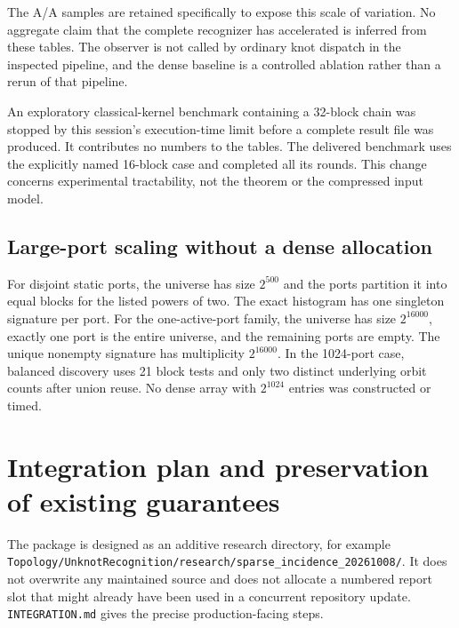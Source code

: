 \documentclass[11pt,letterpaper]{article}
\newcommand{\code}[1]{\nolinkurl{#1}}
\begin{document}
The A/A samples are retained specifically to expose this scale of variation.
No aggregate claim that the complete recognizer has accelerated is inferred
from these tables. The observer is not called by ordinary knot dispatch in the
inspected pipeline, and the dense baseline is a controlled ablation rather than
a rerun of that pipeline.

An exploratory classical-kernel benchmark containing a 32-block chain was
stopped by this session's execution-time limit before a complete result file
was produced. It contributes no numbers to the tables. The delivered benchmark
uses the explicitly named 16-block case and completed all its rounds. This
change concerns experimental tractability, not the theorem or the compressed
input model.

\subsection{Large-port scaling without a dense allocation}
\begin{table}[htbp]
\centering\small

\caption{Completed balanced-only scaling runs, seven repetitions each. The
``dense slots'' column is the output-format requirement, not a measured dense
run or an extrapolated timing.}
\label{tab:scaling}
\end{table}

For disjoint static ports, the universe has size $2^{500}$ and the ports
partition it into equal blocks for the listed powers of two. The exact
histogram has one singleton signature per port. For the one-active-port
family, the universe has size $2^{16000}$, exactly one port is the entire
universe, and the remaining ports are empty. The unique nonempty signature
has multiplicity $2^{16000}$. In the 1024-port case, balanced discovery uses
21 block tests and only two distinct underlying orbit counts after union
reuse. No dense array with $2^{1024}$ entries was constructed or timed.

\section{Integration plan and preservation of existing guarantees}
\label{sec:integration}

The package is designed as an additive research directory, for example
\code{Topology/UnknotRecognition/research/sparse_incidence_20261008/}.
It does not overwrite any maintained source and does not allocate a numbered
report slot that might already have been used in a concurrent repository
update. \code{INTEGRATION.md} gives the precise production-facing steps.
\end{document}
